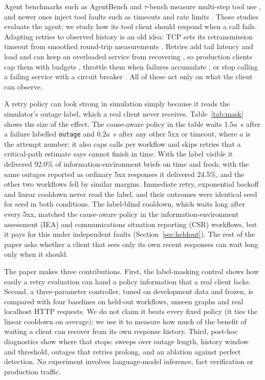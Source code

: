 \documentclass[conference,a4paper]{IEEEtran}
\begin{document}
Agent benchmarks such as AgentBench and $\tau$-bench measure multi-step tool use \cite{agentbench,taubench}, and newer ones inject tool faults such as timeouts and rate limits \cite{reliabilitybench,toolbenchx}. Those studies evaluate the agent; we study how its tool client should respond when a call fails. Adapting retries to observed history is an old idea: TCP sets its retransmission timeout from smoothed round-trip measurements \cite{rfc6298}. Retries add tail latency and load \cite{tail,brooker} and can keep an overloaded service from recovering \cite{bronson,huang}, so production clients cap them with budgets \cite{sre}, throttle them when failures accumulate \cite{grpc,awsretry}, or stop calling a failing service with a circuit breaker \cite{nygard,resilience4j}. All of these act only on what the client can observe.



A retry policy can look strong in simulation simply because it reads the simulator's outage label, which a real client never receives. Table~\ref{tab:mask} shows the size of the effect. The cause-aware policy in the table waits $1.5a$~s after a failure labelled \texttt{outage} and $0.2a$~s after any other 5xx or timeout, where $a$ is the attempt number; it also caps calls per workflow and skips retries that a critical-path estimate says cannot finish in time. With the label visible it delivered 92.0\% of information-environment briefs on time and fresh; with the same outages reported as ordinary 5xx responses it delivered 24.5\%, and the other two workflows fell by similar margins. Immediate retry, exponential backoff and linear cooldown never read the label, and their outcomes were identical seed for seed in both conditions. The label-blind cooldown, which waits long after every 5xx, matched the cause-aware policy in the information-environment assessment (IEA) and communications situation reporting (CSR) workflows, but it pays for this under independent faults (Section~\ref{sec:heldout}). The rest of the paper asks whether a client that sees only its own recent responses can wait long only when it should.

The paper makes three contributions. First, the label-masking control shows how easily a retry evaluation can hand a policy information that a real client lacks. Second, a three-parameter controller, tuned on development data and frozen, is compared with four baselines on held-out workflows, unseen graphs and real localhost HTTP requests. We do not claim it beats every fixed policy (it ties the linear cooldown on average); we use it to measure how much of the benefit of waiting a client can recover from its own response history. Third, post-hoc diagnostics show where that stops: sweeps over outage length, history window and threshold, outages that retries prolong, and an ablation against perfect detection. No experiment involves language-model inference, fact verification or production traffic.
\end{document}
